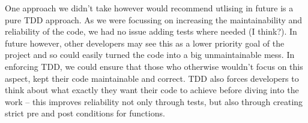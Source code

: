 \documentclass[a4paper]{article}
\begin{document}
One approach we didn't take however would recommend utlising in future is a pure
TDD approach. As we were focussing on increasing the maintainability and reliability
of the code, we had no issue adding tests where needed (I think?). In future however,
other developers may see this as a lower priority goal of the project and so could
easily turned the code into a big unmaintainable mess. In enforcing TDD, we could
ensure that those who otherwise wouldn't focus on this aspect, kept their code
maintainable and correct. TDD also forces developers to think about what exactly
they want their code to achieve before diving into the work -- this improves
reliability not only through tests, but also through creating strict pre and
post conditions for functions. 
\end{document}
